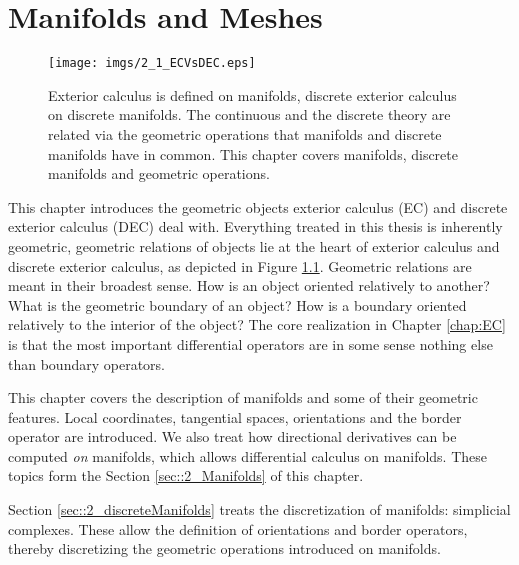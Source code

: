 \chapter{Manifolds and Meshes}

\begin{figure}[h]
\begin{center}
\texttt{[image: imgs/2\_1\_ECVsDEC.eps]}
\end{center}
\vspace{-0.5cm}
\caption{Exterior calculus is defined on manifolds, discrete exterior calculus on discrete manifolds. The continuous and the discrete theory are related via the geometric operations that manifolds and discrete manifolds have in common.  This chapter covers manifolds, discrete manifolds and geometric operations.}
\label{fig:2_ECVvsDEC}
\end{figure}


This chapter introduces the geometric objects exterior calculus (EC) and discrete exterior calculus (DEC) deal with. Everything treated in this thesis is inherently geometric, geometric relations of objects lie at the heart of exterior calculus and discrete exterior calculus, as depicted in Figure \ref{fig:2_ECVvsDEC}. Geometric relations are meant in their broadest sense. How is an object oriented relatively to another? What is the geometric boundary of an object? How is a boundary oriented relatively to the interior of the object? The core realization in Chapter \ref{chap:EC} is that the most important differential operators are in some sense nothing else than boundary operators. 


This chapter covers the description of manifolds and some of their geometric features. Local coordinates, tangential spaces, orientations and the border operator are introduced. We also treat how directional derivatives can be computed \emph{on} manifolds, which allows differential calculus on manifolds. These topics form the Section \ref{sec::2_Manifolds} of this chapter.

Section \ref{sec::2_discreteManifolds} treats the discretization of manifolds: simplicial complexes. These allow the definition of orientations and border operators, thereby discretizing the geometric operations introduced on manifolds.


